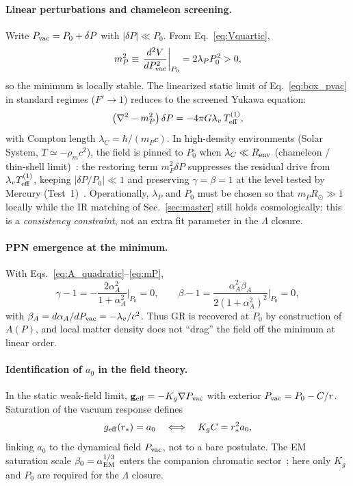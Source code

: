 \documentclass[prd,
               reprint,
               aps,
               preprintnumbers,
               nofootinbib,
               longbibliography,
               floatfix]{revtex4-2}
\begin{document}
\paragraph{Linear perturbations and chameleon screening.}
Write $P_{\rm vac}=P_0+\delta P$ with $|\delta P|\ll P_0$.
From Eq.~\eqref{eq:Vquartic},
\begin{equation}
\label{eq:mP}
m_P^2
\equiv
\left.\frac{d^2V}{dP_{\rm vac}^2}\right|_{P_0}
=
2\lambda_P P_0^2
>0,
\end{equation}
so the minimum is locally stable.
The linearized static limit of Eq.~\eqref{eq:box_pvac} in standard regimes 
($F' \to 1$) reduces to the screened Yukawa equation:
\begin{equation}
\label{eq:yukawa}
\left(\nabla^2-m_P^2\right)\delta P
=
-4\pi G\lambda_v\,T_{\rm eff}^{(1)},
\end{equation}
with Compton length $\lambda_C=\hbar/(m_P c)$.
In high-density environments (Solar System, $T\simeq -\rho_m c^2$),
the field is pinned to $P_0$ when $\lambda_C\ll R_{\rm env}$ (chameleon /
thin-shell limit)~\cite{Khoury2004,Hinterbichler2011}: the restoring 
term $m_P^2\delta P$ suppresses the residual drive from 
$\lambda_v T_{\rm eff}^{(1)}$, keeping $|\delta P/P_0|\ll 1$
and preserving $\gamma=\beta=1$ at the level tested by Mercury
(Test~1)~\cite{Will2014}.
Operationally, $\lambda_P$ and $P_0$ must be chosen so that
$m_P R_\odot\gg 1$ locally while the IR matching of
Sec.~\ref{sec:master} still holds cosmologically; this is a
\emph{consistency constraint}, not an extra fit parameter in the
$\Lambda$ closure.

\paragraph{PPN emergence at the minimum.}
With Eqs.~\eqref{eq:A_quadratic}--\eqref{eq:mP},
\begin{equation}
\label{eq:ppn}
\gamma-1
=
-\frac{2\alpha_A^2}{1+\alpha_A^2}\Big|_{P_0}
=0,
\qquad
\beta-1
=
\frac{\alpha_A^2\beta_A}{2(1+\alpha_A^2)^2}\Big|_{P_0}
=0,
\end{equation}
with $\beta_A=d\alpha_A/dP_{\rm vac}=-\lambda_v/c^2$.
Thus GR is recovered at $P_0$ by construction of $A(P)$, and local
matter density does not ``drag'' the field off the minimum at linear order.

\paragraph{Identification of $a_0$ in the field theory.}
In the static weak-field limit,
$\mathbf{g}_{\rm eff}=-K_g\nabla P_{\rm vac}$ with exterior
$P_{\rm vac}=P_0-C/r$.
Saturation of the vacuum response defines
\begin{equation}
\label{eq:a0_field}
g_{\rm eff}(r_\ast)=a_0
\quad\Longleftrightarrow\quad
K_g C=r_\ast^2 a_0,
\end{equation}
linking $a_0$ to the dynamical field $P_{\rm vac}$, not to a bare
postulate.
The EM saturation scale $\beta_0=\alpha_{\rm EM}^{1/3}$ enters the
companion chromatic sector~\cite{cromatic2zenodo}; here only $K_g$ and
$P_0$ are required for the $\Lambda$ closure.
\end{document}
